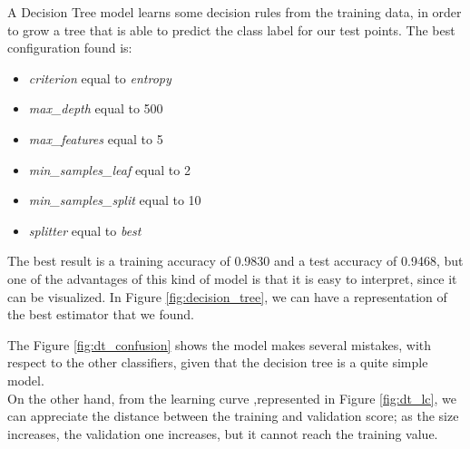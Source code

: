 A Decision Tree model learns some decision rules from the training data, in order to grow a tree that is able to predict the class label for our test points. 
The best configuration found is:
\begin{itemize}
\item \emph{criterion} equal to \emph{entropy}
\item \emph{max\_depth} equal to 500
\item \emph{max\_features} equal to 5
\item \emph{min\_samples\_leaf} equal to 2
\item \emph{min\_samples\_split} equal to 10
\item \emph{splitter} equal to \emph{best}
\end{itemize}

The best result is a training accuracy of 0.9830 and a test accuracy of 0.9468, but one of the advantages of this kind of model is that it is easy to interpret, since it can be visualized.
In Figure \ref{fig:decision_tree}, we can have a representation of the best estimator that we found.

The Figure \ref{fig:dt_confusion} shows the model makes several mistakes, with respect to the other classifiers, given that the decision tree is a quite simple model.\\
On the other hand, from the learning curve ,represented in Figure \ref{fig:dt_lc}, we can appreciate the distance between the training and validation score; as the size increases, the validation one increases, but it cannot reach the training value.

